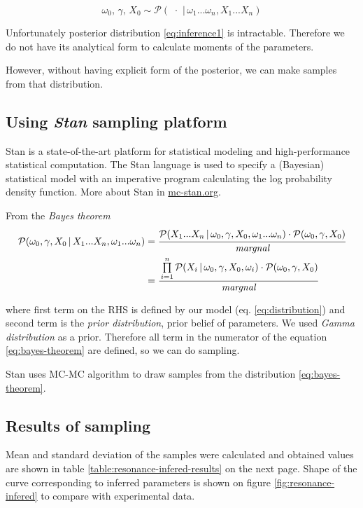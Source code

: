 \documentclass[12pt,a4paper]{article}
\begin{document}
  \begin{equation}\label{eq:inference1}
  \omega_0, \, \gamma, \, X_0 \sim \mathcal{P}(\,\, \cdot \,\, | \, \omega_1...\omega_n, X_1...X_n)
  \end{equation}
  
  Unfortunately posterior distribution \ref{eq:inference1} is intractable. Therefore we do not have its analytical form to calculate moments of the parameters.
  
  However, without having explicit form of the posterior, we can make samples from that distribution.
  
  \subsection{Using \emph{Stan} sampling platform}
  Stan is a state-of-the-art platform for statistical modeling and high-performance statistical computation\cite{stan}. The Stan language is used to specify a (Bayesian) statistical model with an imperative program calculating the log probability density function. More about Stan in \url{mc-stan.org}.
  
  From the \textit{Bayes theorem}
  \begin{align}
  \begin{split}
  \mathcal{P}(\omega_0, \gamma,X_0\,|\,X_1...X_n, \omega_1...\omega_n) &=
  \cfrac{\mathcal{P}(X_1...X_n\,|\,\omega_0,\gamma,X_0,\omega_1...\omega_n) \cdot
  	\mathcal{P}(\omega_0,\gamma,X_0)
  }{\textit{margnal}} \\
&= \cfrac{\prod\limits_{i=1}^{n}\mathcal{P}(X_i\,|\,\omega_0,\gamma,X_0, \omega_i) \cdot
	\mathcal{P}(\omega_0,\gamma,X_0)
}{\textit{margnal}}
\end{split}
\label{eq:bayes-theorem}
  \end{align}
 
  
  
  where first term on the RHS is defined by our model (eq. \ref{eq:distribution})
  and second term is the \textit{prior distribution}, prior belief of parameters. We used \textit{Gamma distribution} as a prior. Therefore all term in the numerator of the equation \ref{eq:bayes-theorem} are defined, so we can do sampling.
  
  Stan uses MC-MC algorithm to draw samples from the distribution \ref{eq:bayes-theorem}. 
  
  \subsection{Results of sampling} \label{section:sampling-results}
  Mean and standard deviation of the samples were calculated and obtained values are shown in table \ref{table:resonance-infered-results} on the next page. Shape of the curve corresponding to inferred parameters is shown on figure \ref{fig:resonance-infered} to compare with experimental data.
  
\end{document}
